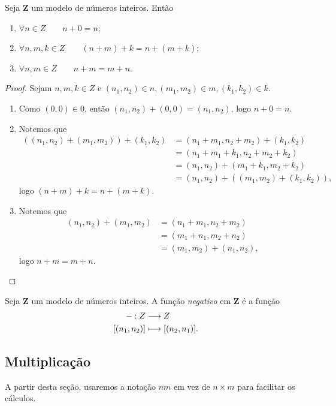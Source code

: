 \begin{prop}
	Seja $\bm Z$ um modelo de números inteiros. Então
	\begin{enumerate}
	\item $\forall n \in Z \qquad n+0=n$;
	\item $\forall n,m,k \in Z \qquad (n+m)+k=n+(m+k)$;
	\item $\forall n,m \in Z \qquad n+m=m+n$.
	\end{enumerate}
\end{prop}
\begin{proof} Sejam $n,m,k \in Z$ e $(n_1,n_2) \in n,(m_1,m_2) \in m,(k_1,k_2) \in k$.
	\begin{enumerate}
	\item Como $(0,0) \in 0$, então $(n_1,n_2)+(0,0)=(n_1,n_2)$, logo $n+0=n$.
	
	\item Notemos que
	\begin{align*}
	((n_1,n_2)+(m_1,m_2))+(k_1,k_2) &= (n_1+m_1,n_2+m_2)+(k_1,k_2) \\
		&= (n_1+m_1+k_1,n_2+m_2+k_2) \\
		&= (n_1,n_2) +(m_1+k_1,m_2+k_2) \\
		&= (n_1,n_2) +((m_1,m_2)+(k_1,k_2)),
	\end{align*}
logo $(n+m)+k=n+(m+k)$.

	\item Notemos que
	\begin{align*}
	(n_1,n_2)+(m_1,m_2) &= (n_1+m_1,n_2+m_2) \\
	&= (m_1+n_1,m_2+n_2) \\
	&= (m_1,m_2) +(n_1,n_2),
	\end{align*}
logo $n+m=m+n$.
	\end{enumerate}
\end{proof}

\begin{defi}
	Seja $\bm Z$ um modelo de números inteiros. A função \emph{negativo} em $\bm Z$ é a função
	\begin{align*}
	{-}: {Z} &\longrightarrow {Z} \\{[(n_1,n_2)]} &\longmapsto {[(n_2,n_1)]}.
	\end{align*}
\end{defi}


\subsection{Multiplicação}

A partir desta seção, usaremos a notação $nm$ em vez de $n \times m$ para facilitar os cálculos.

